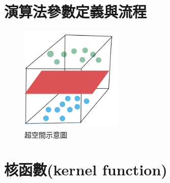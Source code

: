 \section{演算法參數定義與流程}



\begin{figure}[H]
	\centerline{\includegraphics[height=5cm]{pic/over space.PNG}}
	\caption{超空間示意圖}
	\label{fig:Hyperspace}
\end{figure}
\label{sec:background}

\section{核函數(kernel function)}

